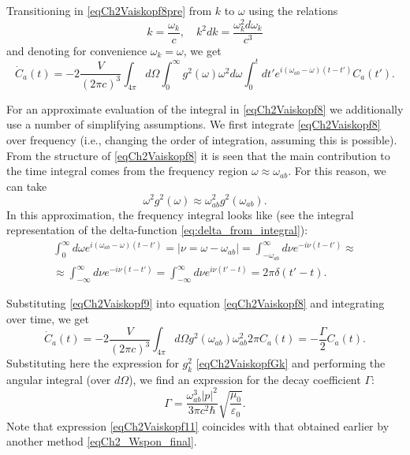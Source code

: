 Transitioning in \eqref{eqCh2Vaiskopf8pre} from $k$ to $\omega$ using the relations 
\begin{equation}
k = \frac{\omega_k}{c}, \quad k^2 dk = \frac{\omega_k^2 d \omega_k}{c^3}
\nonumber
\end{equation}
and denoting for convenience \(\omega_k = \omega\),
we get
\begin{equation}
\dot{C}_{a}\left(t\right) = - 
2 \frac{V}{\left(2 \pi c\right)^3} \int_{4\pi}d \Omega \int_0^{\infty}
g^2\left(\omega\right) \omega^2 d\omega  \int_0^t dt'
e^{i \left(\omega_{ab} - \omega\right)\left(t - t'\right)}  
C_{a}\left(t'\right).
\label{eqCh2Vaiskopf8}
\end{equation}

For an approximate evaluation of the integral in \eqref{eqCh2Vaiskopf8}
we additionally use a number of simplifying assumptions.
We first integrate \eqref{eqCh2Vaiskopf8} over frequency (i.e., changing
the order of integration, assuming this is possible). From the structure of 
\eqref{eqCh2Vaiskopf8} it is seen that the main contribution to the time integral
comes from the frequency region $\omega \approx \omega_{ab}$. For this reason,
we can take 
\[
\omega^2 g^2\left(\omega\right) \approx 
\omega_{ab}^2 g^2\left(\omega_{ab}\right).
\]
In this approximation, the frequency integral looks like (see
the integral representation of the delta-function
\eqref{eq:delta_from_integral}):  
\begin{eqnarray}
\int_0^{\infty}d \omega e^{i\left(\omega_{ab} - \omega\right)\left(t -
  t'\right)}  = \left|\nu = \omega - \omega_{ab}\right| =
\int_{- \omega_{ab}}^{\infty}d \nu e^{-i \nu\left(t - t'\right)} \approx
\nonumber \\
\approx \int_{- \infty}^{\infty} d \nu e^{-i \nu\left(t - t'\right)} = 
\int_{- \infty}^{\infty} d \nu e^{i \nu\left(t' - t\right)} =
2 \pi \delta\left(t' - t\right).
\label{eqCh2Vaiskopf9}
\end{eqnarray}

Substituting \eqref{eqCh2Vaiskopf9} into equation \eqref{eqCh2Vaiskopf8} and
integrating over time, we get
\begin{equation}
\dot{C}_{a}\left(t\right) = - 
2 \frac{V}{\left(2 \pi c\right)^3} \int_{4\pi}d \Omega 
g^2\left(\omega_{ab}\right) \omega_{ab}^2   
2 \pi C_{a}\left(t\right) = - \frac{\Gamma}{2} C_{a}\left(t\right).
\label{eqCh2Vaiskopf10}
\end{equation}
Substituting here the expression for $g_k^2$ \eqref{eqCh2VaiskopfGk} and
performing the angular integral (over $d \Omega$), we find an expression for
the decay coefficient $\Gamma$:
\begin{equation}
\Gamma = \frac{\omega_{ab}^3 \left|p\right|^2}{3 \pi c^2 \hbar}
\sqrt{\frac{\mu_0}{\varepsilon_0}}. 
\label{eqCh2Vaiskopf11}
\end{equation}
Note that expression \eqref{eqCh2Vaiskopf11} coincides with that obtained
earlier by another method \eqref{eqCh2_Wspon_final}.


